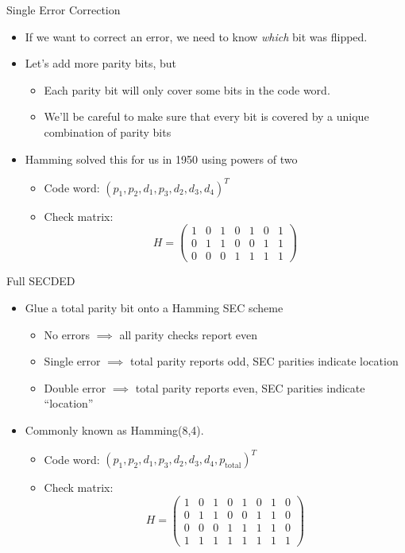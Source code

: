 \documentclass[pdf]{beamer}
\begin{document}
\begin{frame}{Single Error Correction}
  \begin{itemize}
    \item If we want to correct an error, we need to know \emph{which} bit was
      flipped.
    \item Let's add more parity bits, but
      \begin{itemize}
      \item Each parity bit will only cover some bits in the code word.
      \item We'll be careful to make sure that every bit is covered by a unique
        combination of parity bits
      \end{itemize}
    \item Hamming solved this for us in 1950 using powers of two
      \begin{itemize}
      \item Code word: $(p_1,p_2,d_1,p_3,d_2,d_3,d_4)^T$
      \item Check matrix: \[ H = \begin{pmatrix}
            1 & 0 & 1 & 0 & 1 & 0 & 1 \\
            0 & 1 & 1 & 0 & 0 & 1 & 1 \\
            0 & 0 & 0 & 1 & 1 & 1 & 1
          \end{pmatrix} \]
      \end{itemize}
  \end{itemize}
\end{frame}
\begin{frame}{Full SECDED}
  \begin{itemize}
  \item Glue a total parity bit onto a Hamming SEC scheme
    \begin{itemize}
    \item No errors $\implies$ all parity checks report even
    \item Single error $\implies$ total parity reports odd, SEC parities indicate location
    \item Double error $\implies$ total parity reports even, SEC parities indicate ``location''
    \end{itemize}
  \item Commonly known as Hamming(8,4).
    \begin{itemize}
      \item Code word: $(p_1,p_2,d_1,p_3,d_2,d_3,d_4,p_\text{total})^T$
      \item Check matrix: \[ H = \begin{pmatrix}
            1 & 0 & 1 & 0 & 1 & 0 & 1 & 0 \\
            0 & 1 & 1 & 0 & 0 & 1 & 1 & 0 \\
            0 & 0 & 0 & 1 & 1 & 1 & 1 & 0 \\
            1 & 1 & 1 & 1 & 1 & 1 & 1 & 1
          \end{pmatrix} \]
      \end{itemize}
  \end{itemize}
\end{frame}
\end{document}
